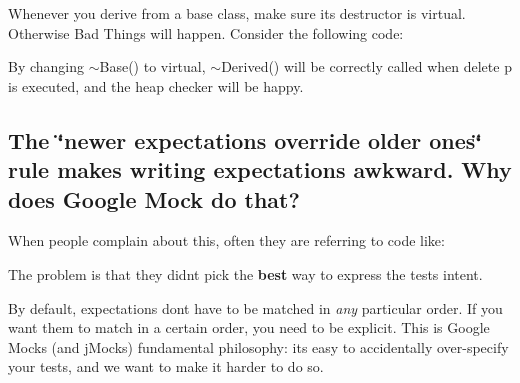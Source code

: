 Whenever you derive from a base class, make sure its destructor is virtual. Otherwise Bad Things will happen. Consider the following code\+:


\begin{DoxyCode}{0}
\DoxyCodeLine{\};}
\DoxyCodeLine{}
\DoxyCodeLine{\};}
\DoxyCodeLine{}
\end{DoxyCode}


By changing {\ttfamily $\sim$\+Base()} to virtual, {\ttfamily $\sim$\+Derived()} will be correctly called when {\ttfamily delete p} is executed, and the heap checker will be happy.

\subsection*{The \char`\"{}newer expectations override older ones\char`\"{} rule makes writing expectations awkward. Why does Google Mock do that?}

When people complain about this, often they are referring to code like\+:


\begin{DoxyCode}{0}
\end{DoxyCode}


The problem is that they didn\textquotesingle{}t pick the {\bfseries best} way to express the test\textquotesingle{}s intent.

By default, expectations don\textquotesingle{}t have to be matched in {\itshape any} particular order. If you want them to match in a certain order, you need to be explicit. This is Google Mock\textquotesingle{}s (and j\+Mock\textquotesingle{}s) fundamental philosophy\+: it\textquotesingle{}s easy to accidentally over-\/specify your tests, and we want to make it harder to do so.

